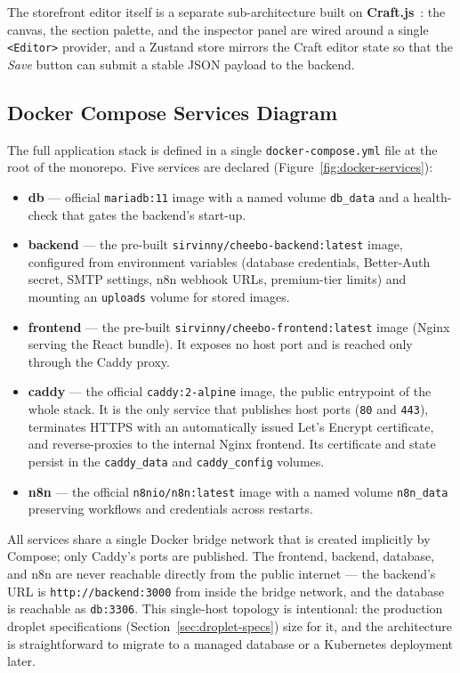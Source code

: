 \documentclass[12pt, a4paper, oneside]{report}
\begin{document}
The storefront editor itself is a separate sub-architecture built on
\textbf{Craft.js}~\cite{craftjs}: the canvas, the section palette, and the
inspector panel are wired around a single \texttt{<Editor>} provider,
and a Zustand store mirrors the Craft editor state so that the
\textit{Save} button can submit a stable JSON payload to the
backend.

\subsection{Docker Compose Services Diagram}

The full application stack is defined in a single
\texttt{docker-compose.yml} file at the root of the monorepo. Five
services are declared (Figure~\ref{fig:docker-services}):

\begin{itemize}[leftmargin=*,itemsep=2pt]
  \item \textbf{db} --- official \texttt{mariadb:11} image with a
        named volume \texttt{db\_data} and a health-check that
        gates the backend's start-up.
  \item \textbf{backend} --- the pre-built
        \texttt{sirvinny/cheebo-backend:latest} image, configured
        from environment variables (database credentials,
        Better-Auth secret, SMTP settings, n8n webhook URLs,
        premium-tier limits) and mounting an \texttt{uploads}
        volume for stored images.
  \item \textbf{frontend} --- the pre-built
        \texttt{sirvinny/cheebo-frontend:latest} image (Nginx
        serving the React bundle). It exposes no host port and is
        reached only through the Caddy proxy.
  \item \textbf{caddy} --- the official \texttt{caddy:2-alpine}
        image, the public entrypoint of the whole stack. It is the
        only service that publishes host ports (\texttt{80} and
        \texttt{443}), terminates HTTPS with an automatically issued
        Let's Encrypt certificate, and reverse-proxies to the
        internal Nginx frontend. Its certificate and state persist in
        the \texttt{caddy\_data} and \texttt{caddy\_config} volumes.
  \item \textbf{n8n} --- the official \texttt{n8nio/n8n:latest}
        image with a named volume \texttt{n8n\_data} preserving
        workflows and credentials across restarts.
\end{itemize}

All services share a single Docker bridge network that is created
implicitly by Compose; only Caddy's ports are published. The
frontend, backend, database, and n8n are never reachable directly
from the public internet --- the backend's URL is
\texttt{http://backend:3000} from inside the bridge network, and the
database is reachable as \texttt{db:3306}. This single-host topology
is intentional: the production droplet specifications
(Section~\ref{sec:droplet-specs}) size for it, and the architecture is
straightforward to migrate to a managed database or a Kubernetes
deployment later.
\end{document}
